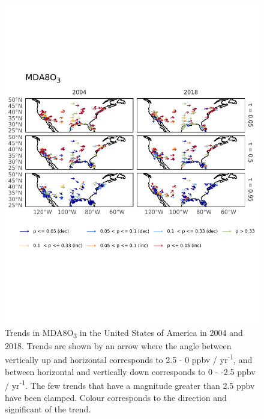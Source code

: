 \documentclass{article}
\begin{document}
\begin{figure}[p]
\centering
\includegraphics[height=0.9\textheight]{figures/si_figures/fS06_o3_map_mda8_all_us_o3.pdf}
\caption{Trends in MDA8O\textsubscript{3} in the United States of America in 2004 and 2018. Trends are shown by an arrow where the angle between vertically up and horizontal corresponds to 2.5 - 0 ppbv / yr\textsuperscript{-1}, and between horizontal and vertically down corresponds to 0 - -2.5 ppbv / yr\textsuperscript{-1}. The few trends that have a magnitude greater than 2.5 ppbv have been clamped. Colour corresponds to the direction and significant of the trend.}
\label{si_fig:o3_map_us_mda8}
\end{figure}
\clearpage
\end{document}
